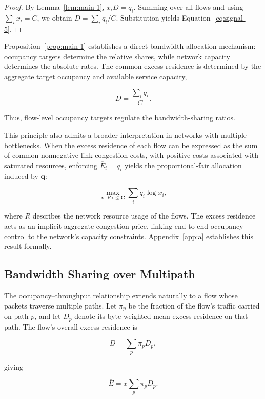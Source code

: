 \begin{proof} By Lemma~\ref{lem:main-1}, \(x_iD=q_i\). Summing over all flows and using \(\sum_i x_i=C\), we obtain \(D=\sum_iq_i/C\). Substitution yields Equation~\eqref{eq:signal-5}.
\end{proof}

Proposition~\ref{prop:main-1} establishes a direct bandwidth allocation mechanism: occupancy targets determine the relative shares, while network capacity determines the absolute rates. The common excess residence is determined by the aggregate target occupancy and available service capacity,

\[
D=\frac{\sum_iq_i}{C}.
\]

Thus, flow-level occupancy targets regulate the bandwidth-sharing ratios.

This principle also admits a broader interpretation in networks with multiple bottlenecks. When the excess residence of each flow can be expressed as the sum of common nonnegative link congestion costs, with positive costs associated with saturated resources, enforcing \(\overline E_i=q_i\) yields the proportional-fair allocation induced by \(\mathbf q\):

\begin{equation}
\label{eq:signal-6}
\max_{\mathbf x:\,R\mathbf x\le\mathbf C}
\sum_i q_i\log x_i,
\end{equation}

where \(R\) describes the network resource usage of the flows. The excess residence acts as an implicit aggregate congestion price, linking end-to-end occupancy control to the network's capacity constraints. Appendix~\ref{app:a} establishes this result formally.

\subsection{Bandwidth Sharing over Multipath}
\label{sec:multipath}

The occupancy–throughput relationship extends naturally to a flow whose packets traverse multiple paths. Let \(\pi_p\) be the fraction of the flow's traffic carried on path \(p\), and let \(D_p\) denote its byte-weighted mean excess residence on that path. The flow's overall excess residence is

\[
D=\sum_p\pi_pD_p,
\]

giving

\begin{equation}
\label{eq:signal-7}
\boxed{
\overline E=x\sum_p\pi_pD_p.
}
\end{equation}

